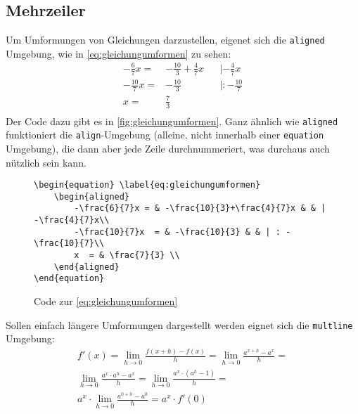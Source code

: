 \subsection{Mehrzeiler}
Um Umformungen von Gleichungen darzustellen, 
eigenet sich die {\tt aligned} Umgebung, wie in 
\autoref{eq:gleichungumformen} zu sehen:
\begin{equation} \label{eq:gleichungumformen}
	\begin{aligned}
		-\frac{6}{7}x = & -\frac{10}{3}+\frac{4}{7}x & & | -\frac{4}{7}x\\
		-\frac{10}{7}x  = & -\frac{10}{3} & & | : -\frac{10}{7}\\
		x  = & \frac{7}{3} \\
	\end{aligned}
\end{equation}
Der Code dazu gibt es in \autoref{fig:gleichungumformen}.
Ganz ähnlich wie {\tt aligned} funktioniert die {\tt align}-Umgebung 
(alleine, nicht innerhalb einer {\tt equation} Umgebung), 
die dann aber jede
Zeile durchnummeriert, was durchaus auch nützlich sein kann.
\begin{figure}[ht]
\centering
\begin{minipage}{0.95\textwidth}
\begin{verbatim}
\begin{equation} \label{eq:gleichungumformen}
    \begin{aligned}
        -\frac{6}{7}x = & -\frac{10}{3}+\frac{4}{7}x & & | -\frac{4}{7}x\\
        -\frac{10}{7}x  = & -\frac{10}{3} & & | : -\frac{10}{7}\\
        x  = & \frac{7}{3} \\
    \end{aligned}
\end{equation}
\end{verbatim}
\end{minipage}
	\caption{Code zur \autoref{eq:gleichungumformen}}
\label{fig:gleichungumformen}
\end{figure}


%
Sollen einfach längere Umformungen dargestellt werden
eignet sich die {\tt multline} Umgebung:
\begin{multline} \label{eq:langeumformung}
	f'(x) = \lim_{h \to 0} \frac{f(x+h)-f(x)}{h} = 
	\lim_{h \to 0} \frac{a^{x+h}-a^x}{h} =  \\
	\lim_{h \to 0} \frac{a^x \cdot a^h-a^x}{h} = 
	\lim_{h \to 0} \frac{a^x \cdot \left(a^h-1\right)}{h} =  \\
	a^x \cdot \lim_{h \to 0} \frac{a^{0+h}-a^0}{h} = a^x \cdot f'(0)	
\end{multline}

